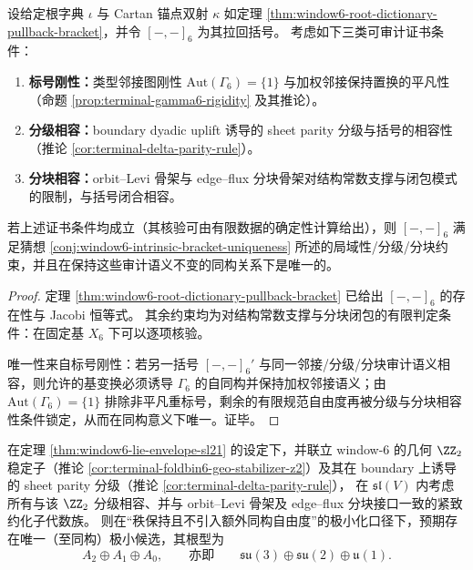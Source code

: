 \begin{theorem}\label{thm:window6-intrinsic-bracket-certificate-theorem}
设给定根字典 \(\iota\) 与 Cartan 锚点双射 \(\kappa\) 如定理 \ref{thm:window6-root-dictionary-pullback-bracket}，并令 \([-,-]_6\) 为其拉回括号。
考虑如下三类可审计证书条件：
\begin{enumerate}
  \item \textbf{标号刚性：}类型邻接图刚性 \(\mathrm{Aut}(\Gamma_6)=\{1\}\) 与加权邻接保持置换的平凡性（命题 \ref{prop:terminal-gamma6-rigidity} 及其推论）。
  \item \textbf{分级相容：}boundary dyadic uplift 诱导的 sheet parity 分级与括号的相容性（推论 \ref{cor:terminal-delta-parity-rule}）。
  \item \textbf{分块相容：}orbit--Levi 骨架与 edge--flux 分块骨架对结构常数支撑与闭包模式的限制，与括号闭合相容。
\end{enumerate}
若上述证书条件均成立（其核验可由有限数据的确定性计算给出），则 \([-,-]_6\) 满足猜想 \ref{conj:window6-intrinsic-bracket-uniqueness} 所述的局域性/分级/分块约束，并且在保持这些审计语义不变的同构关系下是唯一的。
\end{theorem}
\begin{proof}
定理 \ref{thm:window6-root-dictionary-pullback-bracket} 已给出 \([-,-]_6\) 的存在性与 Jacobi 恒等式。
其余约束均为对结构常数支撑与分块闭包的有限判定条件：在固定基 \(X_6\) 下可以逐项核验。\par
唯一性来自标号刚性：若另一括号 \([-,-]_6'\) 与同一邻接/分级/分块审计语义相容，则允许的基变换必须诱导 \(\Gamma_6\) 的自同构并保持加权邻接语义；由 \(\mathrm{Aut}(\Gamma_6)=\{1\}\) 排除非平凡重标号，剩余的有限规范自由度再被分级与分块相容性条件锁定，从而在同构意义下唯一。证毕。
\end{proof}

\begin{conjecture}\label{conj:window6-sm-gauge-as-minimal-compact-observable}
在定理 \ref{thm:window6-lie-envelope-sl21} 的设定下，并联立 window-\(6\) 的几何 \(\ZZ_2\) 稳定子（推论 \ref{cor:terminal-foldbin6-geo-stabilizer-z2}）及其在 boundary 上诱导的 sheet parity 分级（推论 \ref{cor:terminal-delta-parity-rule}），
在 \(\mathfrak{sl}(V)\) 内考虑所有与该 \(\ZZ_2\) 分级相容、并与 orbit--Levi 骨架及 edge--flux 分块接口一致的紧致约化子代数族。
则在“秩保持且不引入额外同构自由度”的极小化口径下，预期存在唯一（至同构）极小候选，其根型为
\[
A_2\oplus A_1\oplus A_0,
\qquad\text{亦即}\qquad
\mathfrak{su}(3)\oplus\mathfrak{su}(2)\oplus\mathfrak{u}(1).
\]
\end{conjecture}

